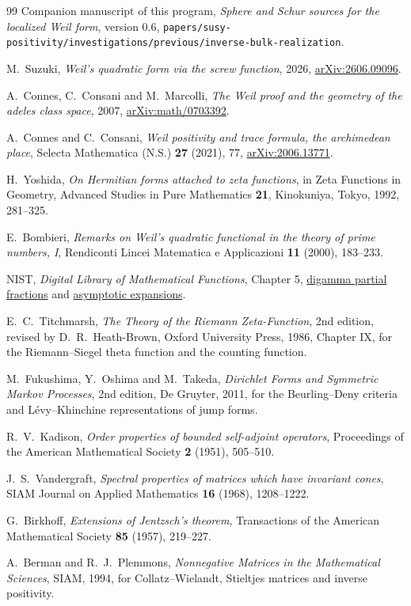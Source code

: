 \begin{thebibliography}{99}
Companion manuscript of this program, \emph{Sphere and Schur sources for the
localized Weil form}, version 0.6,
\texttt{papers/susy-positivity/investigations/\allowbreak previous/\allowbreak inverse-bulk-realization}.

M.~Suzuki, \emph{Weil's quadratic form via the screw function}, 2026,
\href{https://arxiv.org/abs/2606.09096}{arXiv:2606.09096}.

A.~Connes, C.~Consani and M.~Marcolli, \emph{The Weil proof and the geometry of
the adeles class space}, 2007,
\href{https://arxiv.org/abs/math/0703392}{arXiv:math/0703392}.

A.~Connes and C.~Consani, \emph{Weil positivity and trace formula, the
archimedean place}, Selecta Mathematica (N.S.) \textbf{27} (2021), 77,
\href{https://arxiv.org/abs/2006.13771}{arXiv:2006.13771}.

H.~Yoshida, \emph{On Hermitian forms attached to zeta functions}, in Zeta
Functions in Geometry, Advanced Studies in Pure Mathematics \textbf{21},
Kinokuniya, Tokyo, 1992, 281--325.

E.~Bombieri, \emph{Remarks on Weil's quadratic functional in the theory of prime
numbers, I}, Rendiconti Lincei Matematica e Applicazioni \textbf{11} (2000),
183--233.

NIST, \emph{Digital Library of Mathematical Functions}, Chapter 5,
\href{https://dlmf.nist.gov/5.7}{digamma partial fractions} and
\href{https://dlmf.nist.gov/5.11}{asymptotic expansions}.

E.~C.~Titchmarsh, \emph{The Theory of the Riemann Zeta-Function}, 2nd edition,
revised by D.~R.~Heath-Brown, Oxford University Press, 1986, Chapter IX, for the
Riemann--Siegel theta function and the counting function.

M.~Fukushima, Y.~Oshima and M.~Takeda, \emph{Dirichlet Forms and Symmetric
Markov Processes}, 2nd edition, De Gruyter, 2011, for the Beurling--Deny
criteria and L\'evy--Khinchine representations of jump forms.

R.~V.~Kadison, \emph{Order properties of bounded self-adjoint operators},
Proceedings of the American Mathematical Society \textbf{2} (1951), 505--510.

J.~S.~Vandergraft, \emph{Spectral properties of matrices which have invariant
cones}, SIAM Journal on Applied Mathematics \textbf{16} (1968), 1208--1222.

G.~Birkhoff, \emph{Extensions of Jentzsch's theorem}, Transactions of the
American Mathematical Society \textbf{85} (1957), 219--227.

A.~Berman and R.~J.~Plemmons, \emph{Nonnegative Matrices in the Mathematical
Sciences}, SIAM, 1994, for Collatz--Wielandt, Stieltjes matrices and inverse
positivity.
\end{thebibliography}
